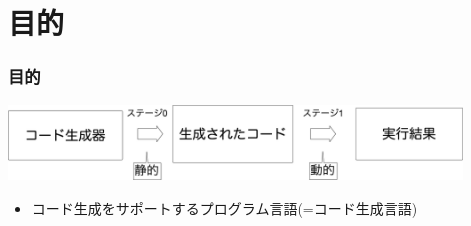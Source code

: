 \section{目的}

\begin{frame}
  \frametitle{目的}

  \medskip
  \flushleft
  \includegraphics[clip,height=2cm]{./img/prggen.png}

  \begin{itemize}
  \item コード生成をサポートするプログラム言語(=\alert{コード生成言語})
  \end{itemize}
\end{frame}

